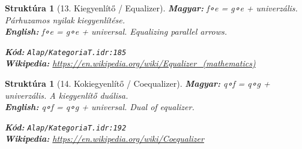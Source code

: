 \documentclass[11pt,a4paper,twocolumn]{article}
\newtheorem{struktura}[tetel]{Struktúra}
\begin{document}
\begin{struktura}[13. Kiegyenlítő / Equalizer]

\textbf{Magyar:} f∘e = g∘e + univerzális. Párhuzamos nyilak kiegyenlítése.\\

\textbf{English:} f∘e = g∘e + universal. Equalizing parallel arrows.\\

\begin{center}
\end{center}

\textbf{Kód:} \texttt{Alap/KategoriaT.idr:185}\\
\textbf{Wikipedia:} \url{https://en.wikipedia.org/wiki/Equalizer_(mathematics)}

\end{struktura}

\vspace{0.5cm}

\begin{struktura}[14. Kokiegyenlítő / Coequalizer]

\textbf{Magyar:} q∘f = q∘g + univerzális. A kiegyenlítő duálisa.\\

\textbf{English:} q∘f = q∘g + universal. Dual of equalizer.\\

\begin{center}
\end{center}

\textbf{Kód:} \texttt{Alap/KategoriaT.idr:192}\\
\textbf{Wikipedia:} \url{https://en.wikipedia.org/wiki/Coequalizer}

\end{struktura}

\vspace{0.5cm}
\end{document}
